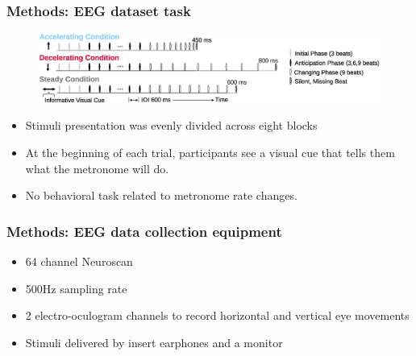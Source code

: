 \documentclass{beamer}
\begin{document}
\begin{frame}
	\frametitle{Methods: EEG dataset task}
	
	\begin{figure}
		\centering
		\includegraphics[scale=0.7]{fig11.jpg}
	\end{figure}
	
	\begin{itemize}
		\item Stimuli presentation was evenly divided across eight blocks

		\item At the beginning of each trial, participants see a visual cue that tells them what the metronome will do. 
		
		\item No behavioral task related to metronome rate changes.

	\end{itemize}

\end{frame}

\begin{frame}
	\frametitle{Methods: EEG data collection equipment}
	
	\begin{itemize}

		\item 64 channel Neuroscan

		\item 500Hz sampling rate

		\item 2 electro-oculogram channels to record horizontal and vertical eye movements 
		
		\item Stimuli delivered by insert earphones and a monitor

	\end{itemize}

\end{frame}
\end{document}
